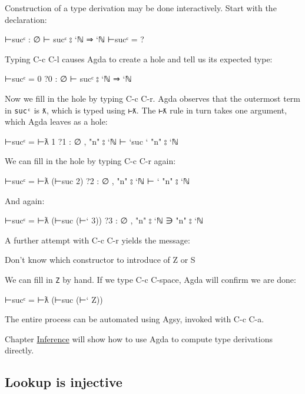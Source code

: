 Construction of a type derivation may be done interactively. Start with
the declaration:

\begin{myDisplay}
⊢sucᶜ : ∅ ⊢ sucᶜ ⦂ `ℕ ⇒ `ℕ
⊢sucᶜ = ?
\end{myDisplay}

Typing C-c C-l causes Agda to create a hole and tell us its expected
type:

\begin{myDisplay}
⊢sucᶜ = { }0
?0 : ∅ ⊢ sucᶜ ⦂ `ℕ ⇒ `ℕ
\end{myDisplay}

Now we fill in the hole by typing C-c C-r. Agda observes that the
outermost term in \texttt{sucᶜ} is \texttt{ƛ}, which is typed using
\texttt{⊢ƛ}. The \texttt{⊢ƛ} rule in turn takes one argument, which Agda
leaves as a hole:

\begin{myDisplay}
⊢sucᶜ = ⊢ƛ { }1
?1 : ∅ , "n" ⦂ `ℕ ⊢ `suc ` "n" ⦂ `ℕ
\end{myDisplay}

We can fill in the hole by typing C-c C-r again:

\begin{myDisplay}
⊢sucᶜ = ⊢ƛ (⊢suc { }2)
?2 : ∅ , "n" ⦂ `ℕ ⊢ ` "n" ⦂ `ℕ
\end{myDisplay}

And again:

\begin{myDisplay}
⊢sucᶜ = ⊢ƛ (⊢suc (⊢` { }3))
?3 : ∅ , "n" ⦂ `ℕ ∋ "n" ⦂ `ℕ
\end{myDisplay}

A further attempt with C-c C-r yields the message:

\begin{myDisplay}
Don't know which constructor to introduce of Z or S
\end{myDisplay}

We can fill in \texttt{Z} by hand. If we type C-c C-space, Agda will
confirm we are done:

\begin{myDisplay}
⊢sucᶜ = ⊢ƛ (⊢suc (⊢` Z))
\end{myDisplay}

The entire process can be automated using Agsy, invoked with C-c C-a.

Chapter \protect\hyperlink{Inference}{Inference} will show how to use
Agda to compute type derivations directly.

\hypertarget{lookup-is-injective}{%
\subsection{Lookup is injective}\label{lookup-is-injective}}

